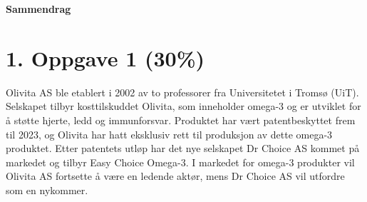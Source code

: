 \documentclass[
  12pt,
  a4paper,
  DIV=11,
  numbers=noendperiod]{scrartcl}
\renewcommand*\contentsname{Table of contents}
\newcommand\contentsname{Table of contents}
\begin{document}







\thispagestyle{plain}
\begin{center}
    \Large
    \textbf{Sammendrag}
\end{center}



\newpage
\hypersetup{linkcolor=black}
\renewcommand{\contentsname}{Innholdsfortegnelse}
\renewcommand*{\figureautorefname}{Figur}
\renewcommand*{\tableautorefname}{Tabell}
\tableofcontents
\newpage
\listoffigures
\listoftables
\hypersetup{linkcolor=blue}
\newpage

\section{1. Oppgave 1 (30\%)}\label{oppgave-1-30}

Olivita AS ble etablert i 2002 av to professorer fra Universitetet i
Tromsø (UiT). Selskapet tilbyr kosttilskuddet Olivita, som inneholder
omega-3 og er utviklet for å støtte hjerte, ledd og immunforsvar.
Produktet har vært patentbeskyttet frem til 2023, og Olivita har hatt
eksklusiv rett til produksjon av dette omega-3 produktet. Etter
patentets utløp har det nye selskapet Dr Choice AS kommet på markedet og
tilbyr Easy Choice Omega-3. I markedet for omega-3 produkter vil Olivita
AS fortsette å være en ledende aktør, mens Dr Choice AS vil utfordre som
en nykommer.
\end{document}
